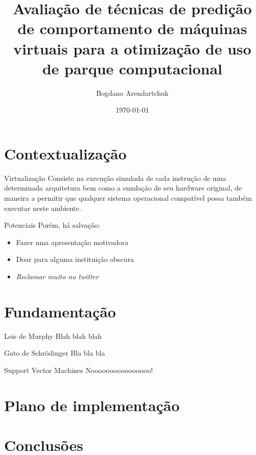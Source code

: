 \documentclass{beamer}
\institute{Universidade Tuiuti do Paraná}
\author{Bogdano Arendartchuk}
\title{Avaliação de técnicas de predição de comportamento de máquinas
virtuais para a otimização de uso de parque computacional}
\date{\today}
\begin{document}
\frame{\titlepage}

\section{Contextualização}
\begin{frame}
\begin{block}{Virtualização}
Consiste na execução simulada de cada instrução de uma determinada
arquitetura bem como a emulação de seu hardware original, de maneira a
permitir que qualquer sistema operacional compatível possa também executar
neste ambiente.\cite{goldberg1974survey}
\end{block}
\end{frame}

\begin{frame}{Potenciais}
Porém, há salvação:
\begin{itemize}
  \item Fazer uma apresentação motivadora
  \item Doar para alguma instituição obscura
  \item \emph{Reclamar muito no twitter}
\end{itemize}
\end{frame}

\section{Fundamentação}
\begin{frame}{Leis de Murphy}
 Blah blah blah
\end{frame}
\begin{frame}{Gato de Schrödinger}
 Bla bla bla
\end{frame}
\begin{frame}{Support Vector Machines}
 Noooooooooooooooo!
\end{frame}

\section{Plano de implementação}

\section{Conclusões}
\end{document}
